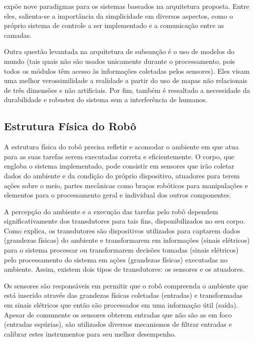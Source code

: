 \citet{brooks85} expõe nove paradigmas para os sistemas baseados na arquitetura proposta. Entre eles, salienta-se a importância da simplicidade em diversos aspectos, como o próprio sistema de controle a ser implementado e a comunicação entre as camadas. 

Outra questão levantada na arquitetura de subsunção é o uso de modelos do mundo (tais quais não são usados unicamente durante o processamento, pois todos os módulos têm acesso às informações coletadas pelos sensores). Eles visam uma melhor verossimilidade a realidade a partir do uso de mapas não relacionais de três dimensões e não artificiais. Por fim, também é ressaltado a necessidade da durabilidade e robustez do sistema sem a interferência de humanos.


\subsection{Estrutura Física do Robô} 

A estrutura física do robô precisa refletir e acomodar o ambiente em que atua para as suas tarefas serem executadas correta e eficientemente. O corpo, que engloba o sistema implementado, pode consistir em sensores que irão coletar dados do ambiente e da condição do próprio dispositivo, atuadores para terem ações sobre o meio, partes mecânicas como braços robóticos para manipulações e elementos para o processamento geral e individual dos outros componentes.

A percepção do ambiente e a execução das tarefas pelo robô dependem significativamente dos transdutores para tais fins, disponibilizados no seu corpo. Como \citet{instrumentacao:2013} explica, os transdutores são dispositivos utilizados para captarem dados (grandezas físicas)  do ambiente e transformarem em informações (sinais elétricos) para o sistema processar ou transformarem decisões tomadas (sinais elétricos) pelo processamento do sistema em ações (grandezas físicas) executadas no ambiente. Assim, existem dois tipos de transdutores: os sensores e os atuadores. 

Os sensores são responsáveis em permitir que o robô compreenda o ambiente que está inserido através das grandezas físicas coletadas (entradas) e transformadas em sinais elétricos que então são processados em uma informação útil (saída). Apesar de comumente os sensores obterem entradas que não são as em foco (entradas espúrias), são utilizados diversos mecanismos de filtrar entradas e calibrar estes instrumentos para seu melhor desempenho. 

